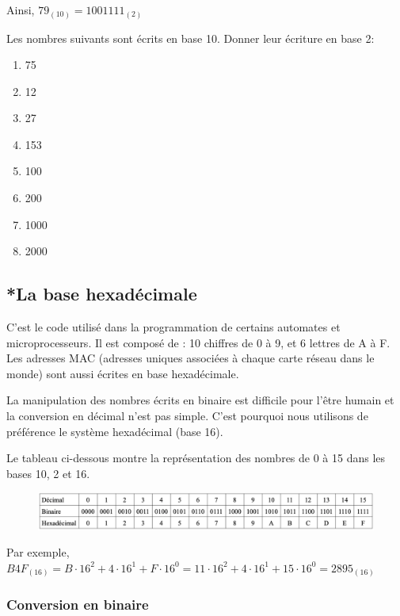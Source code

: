 \documentclass[11pt, a4paper]{book}
\begin{document}
Ainsi, $79_{(10)}=1001111_{(2)}$

\begin{exercice}
Les nombres suivants sont écrits en base 10. Donner leur écriture en base 2:
\begin{multicols}{2}
\begin{enumerate}
\item 75
\item 12
\item 27
\item 153
\item 100
\item 200
\item 1000
\item 2000
\end{enumerate}
\end{multicols}
\end{exercice}

\subsection{*La base hexadécimale}

C'est le code utilisé dans la programmation de certains automates et microprocesseurs. Il est composé de : 10 chiffres de 0 à 9, et 6 lettres de A à F. Les adresses MAC (adresses uniques associées à chaque carte réseau dans le monde) sont aussi écrites en base hexadécimale.

La manipulation des nombres écrits en binaire est difficile pour l'être humain et la conversion en décimal n'est pas simple. C'est pourquoi nous utilisons de préférence le système hexadécimal (base 16). 

Le tableau ci-dessous montre la représentation des nombres de 0 à 15 dans les bases 10, 2 et 16.

\begin{figure}[h]
\begin{center}
\includegraphics[scale=.5]{images/tableaubase}
\end{center}
\end{figure}


Par exemple, $B4F_{(16)}= B \cdot 16^2 + 4 \cdot 16^1 + F\cdot 16^0= 11 \cdot 16^2 + 4 \cdot 16^1 + 15\cdot 16^0=2 895_{(16)}$

\subsubsection{Conversion en binaire}
\end{document}
